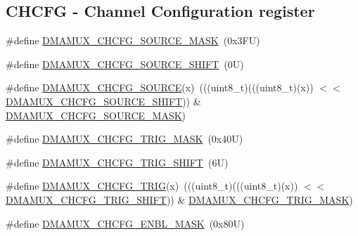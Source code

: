 \subsection*{C\+H\+C\+FG -\/ Channel Configuration register}
\begin{DoxyCompactItemize}
\item 
\#define \mbox{\hyperlink{group___d_m_a_m_u_x___register___masks_ga35b279ba0b1c9e817901494cdac305c5}{D\+M\+A\+M\+U\+X\+\_\+\+C\+H\+C\+F\+G\+\_\+\+S\+O\+U\+R\+C\+E\+\_\+\+M\+A\+SK}}~(0x3\+F\+U)
\item 
\#define \mbox{\hyperlink{group___d_m_a_m_u_x___register___masks_gac2b7553c4599d8e919750598dd03f8a3}{D\+M\+A\+M\+U\+X\+\_\+\+C\+H\+C\+F\+G\+\_\+\+S\+O\+U\+R\+C\+E\+\_\+\+S\+H\+I\+FT}}~(0\+U)
\item 
\#define \mbox{\hyperlink{group___d_m_a_m_u_x___register___masks_ga26ed125b670223f11ea326335729bb9b}{D\+M\+A\+M\+U\+X\+\_\+\+C\+H\+C\+F\+G\+\_\+\+S\+O\+U\+R\+CE}}(x)~(((uint8\+\_\+t)(((uint8\+\_\+t)(x)) $<$$<$ \mbox{\hyperlink{group___d_m_a_m_u_x___register___masks_gac2b7553c4599d8e919750598dd03f8a3}{D\+M\+A\+M\+U\+X\+\_\+\+C\+H\+C\+F\+G\+\_\+\+S\+O\+U\+R\+C\+E\+\_\+\+S\+H\+I\+FT}})) \& \mbox{\hyperlink{group___d_m_a_m_u_x___register___masks_ga35b279ba0b1c9e817901494cdac305c5}{D\+M\+A\+M\+U\+X\+\_\+\+C\+H\+C\+F\+G\+\_\+\+S\+O\+U\+R\+C\+E\+\_\+\+M\+A\+SK}})
\item 
\#define \mbox{\hyperlink{group___d_m_a_m_u_x___register___masks_gafd2b6158f86bedffb640e73c40cdd0f5}{D\+M\+A\+M\+U\+X\+\_\+\+C\+H\+C\+F\+G\+\_\+\+T\+R\+I\+G\+\_\+\+M\+A\+SK}}~(0x40\+U)
\item 
\#define \mbox{\hyperlink{group___d_m_a_m_u_x___register___masks_ga714a6b142fde49d701e3f624bb2417e1}{D\+M\+A\+M\+U\+X\+\_\+\+C\+H\+C\+F\+G\+\_\+\+T\+R\+I\+G\+\_\+\+S\+H\+I\+FT}}~(6\+U)
\item 
\#define \mbox{\hyperlink{group___d_m_a_m_u_x___register___masks_ga7f31af225c1b0eca76b430ba76b5e516}{D\+M\+A\+M\+U\+X\+\_\+\+C\+H\+C\+F\+G\+\_\+\+T\+R\+IG}}(x)~(((uint8\+\_\+t)(((uint8\+\_\+t)(x)) $<$$<$ \mbox{\hyperlink{group___d_m_a_m_u_x___register___masks_ga714a6b142fde49d701e3f624bb2417e1}{D\+M\+A\+M\+U\+X\+\_\+\+C\+H\+C\+F\+G\+\_\+\+T\+R\+I\+G\+\_\+\+S\+H\+I\+FT}})) \& \mbox{\hyperlink{group___d_m_a_m_u_x___register___masks_gafd2b6158f86bedffb640e73c40cdd0f5}{D\+M\+A\+M\+U\+X\+\_\+\+C\+H\+C\+F\+G\+\_\+\+T\+R\+I\+G\+\_\+\+M\+A\+SK}})
\item 
\#define \mbox{\hyperlink{group___d_m_a_m_u_x___register___masks_ga311ccb0a9a00f29da44f8c41b33ba79f}{D\+M\+A\+M\+U\+X\+\_\+\+C\+H\+C\+F\+G\+\_\+\+E\+N\+B\+L\+\_\+\+M\+A\+SK}}~(0x80\+U)

\end{DoxyCompactItemize}
